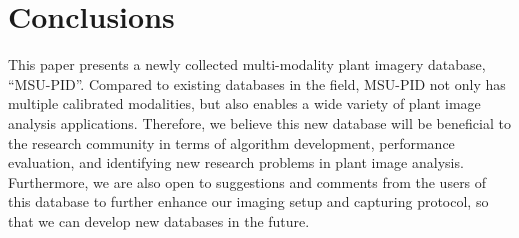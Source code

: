 \section{Conclusions}

This paper presents a newly collected multi-modality plant imagery database, ``MSU-PID''.
Compared to existing databases in the field, MSU-PID not only has multiple calibrated modalities, but also enables a wide variety of plant image analysis applications.
Therefore, we believe this new database will be beneficial to the research community in terms of algorithm development, performance evaluation, and identifying new research problems in plant image analysis.
Furthermore, we are also open to suggestions and comments from the users of this database to further enhance our imaging setup and capturing protocol, so that we can develop new databases in the future. 

